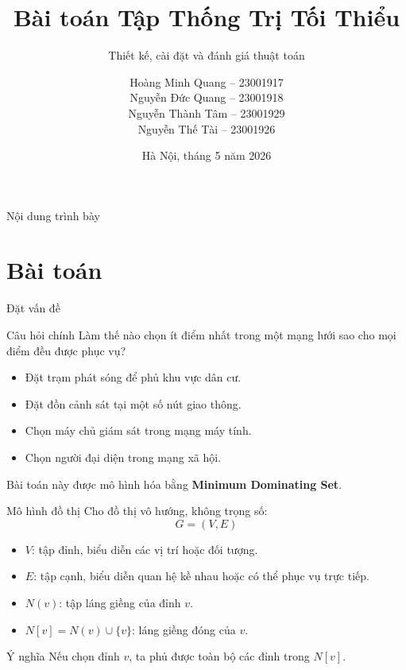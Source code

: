 \documentclass[aspectratio=169, 11pt]{beamer}
\title[Tập thống trị tối thiểu]{Bài toán Tập Thống Trị Tối Thiểu}
\subtitle{Thiết kế, cài đặt và đánh giá thuật toán}
\author[Nhóm 5]{
  Hoàng Minh Quang -- 23001917\\
  Nguyễn Đức Quang -- 23001918\\
  Nguyễn Thành Tâm -- 23001929\\
  Nguyễn Thế Tài -- 23001926
}
\institute{Môn học: Thiết kế và Đánh giá thuật toán}
\date{Hà Nội, tháng 5 năm 2026}
\begin{document}

\begin{frame}
  \titlepage
\end{frame}

\begin{frame}{Nội dung trình bày}
  \tableofcontents
\end{frame}

\section{Bài toán}

\begin{frame}{Đặt vấn đề}
  \begin{block}{Câu hỏi chính}
    Làm thế nào chọn ít điểm nhất trong một mạng lưới sao cho mọi điểm đều được phục vụ?
  \end{block}

  \begin{itemize}
    \item Đặt trạm phát sóng để phủ khu vực dân cư.
    \item Đặt đồn cảnh sát tại một số nút giao thông.
    \item Chọn máy chủ giám sát trong mạng máy tính.
    \item Chọn người đại diện trong mạng xã hội.
  \end{itemize}

  \vspace{0.2cm}
  Bài toán này được mô hình hóa bằng \textbf{Minimum Dominating Set}.
\end{frame}

\begin{frame}{Mô hình đồ thị}
  Cho đồ thị vô hướng, không trọng số:
  \[
    G=(V,E)
  \]

  \begin{itemize}
    \item $V$: tập đỉnh, biểu diễn các vị trí hoặc đối tượng.
    \item $E$: tập cạnh, biểu diễn quan hệ kề nhau hoặc có thể phục vụ trực tiếp.
    \item $N(v)$: tập láng giềng của đỉnh $v$.
    \item $N[v]=N(v)\cup\{v\}$: láng giềng đóng của $v$.
  \end{itemize}

  \begin{block}{Ý nghĩa}
    Nếu chọn đỉnh $v$, ta phủ được toàn bộ các đỉnh trong $N[v]$.
  \end{block}
\end{frame}
\end{document}
